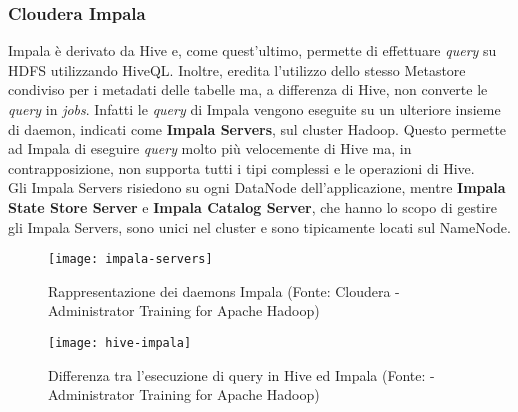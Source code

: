 \subsubsection{Cloudera Impala}
Impala è derivato da Hive e, come quest'ultimo, permette di effettuare \textit{query} su HDFS utilizzando HiveQL. Inoltre, eredita l'utilizzo dello stesso Metastore condiviso per i metadati delle tabelle ma, a differenza di Hive, non converte le \textit{query} in \textit{jobs}. Infatti le \textit{query} di Impala vengono eseguite su un ulteriore insieme di \gls{daemon}, indicati come \textbf{Impala Servers}, sul \gls{cluster} Hadoop. Questo permette ad Impala di eseguire \textit{query} molto più velocemente di Hive ma, in contrapposizione, non supporta tutti i tipi complessi e le operazioni di Hive.\\
Gli Impala Servers risiedono su ogni DataNode dell'applicazione, mentre \textbf{Impala State Store Server} e \textbf{Impala Catalog Server}, che hanno lo scopo di gestire gli Impala Servers, sono unici nel \gls{cluster} e sono tipicamente locati sul NameNode. 
\begin{figure}[!h]
	\centering
	\texttt{[image: impala-servers]}
	\caption{Rappresentazione dei daemons Impala (Fonte: Cloudera - Administrator Training for Apache Hadoop)}
\end{figure}

\begin{figure}[!h]
	\centering
	\texttt{[image: hive-impala]}
	\caption{Differenza tra l'esecuzione di query in Hive ed Impala (Fonte: - Administrator Training for Apache Hadoop)}
\end{figure}

